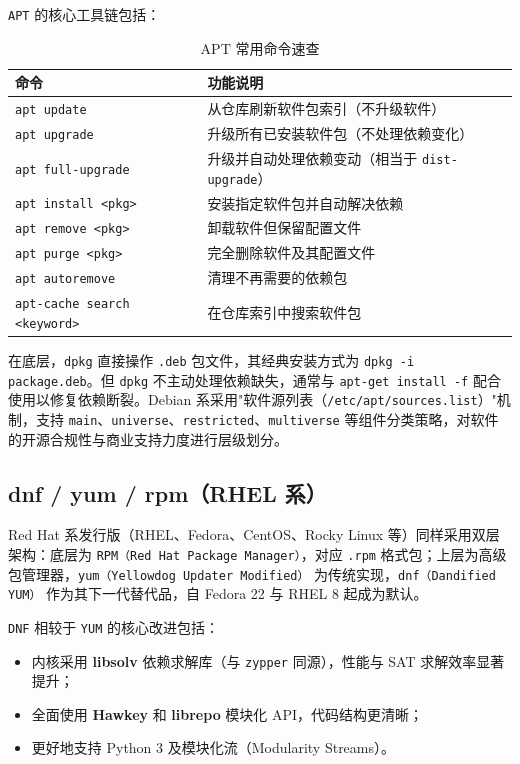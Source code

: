 \documentclass[12pt,UTF8]{ctexbook}
\begin{document}
\texttt{APT} 的核心工具链包括：

\begin{table}[htbp]
	\centering
	\caption{APT 常用命令速查}
	\begin{tabular}{@{}ll@{}}
		\toprule
		\textbf{命令} & \textbf{功能说明} \\
		\midrule
		\verb|apt update| & 从仓库刷新软件包索引（不升级软件） \\
		\verb|apt upgrade| & 升级所有已安装软件包（不处理依赖变化） \\
		\verb|apt full-upgrade| & 升级并自动处理依赖变动（相当于 \verb|dist-upgrade|） \\
		\verb|apt install <pkg>| & 安装指定软件包并自动解决依赖 \\
		\verb|apt remove <pkg>| & 卸载软件但保留配置文件 \\
		\verb|apt purge <pkg>| & 完全删除软件及其配置文件 \\
		\verb|apt autoremove| & 清理不再需要的依赖包 \\
		\verb|apt-cache search <keyword>| & 在仓库索引中搜索软件包 \\
		\bottomrule
	\end{tabular}
\end{table}

在底层，\texttt{dpkg} 直接操作 \texttt{.deb} 包文件，其经典安装方式为 \verb|dpkg -i package.deb|。但 \texttt{dpkg} 不主动处理依赖缺失，通常与 \verb|apt-get install -f| 配合使用以修复依赖断裂。Debian 系采用"软件源列表（\texttt{/etc/apt/sources.list}）"机制，支持 \texttt{main}、\texttt{universe}、\texttt{restricted}、\texttt{multiverse} 等组件分类策略，对软件的开源合规性与商业支持力度进行层级划分。

\subsection{dnf / yum / rpm（RHEL 系）}

Red Hat 系发行版（RHEL、Fedora、CentOS、Rocky Linux 等）同样采用双层架构：底层为 \texttt{RPM（Red Hat Package Manager）}，对应 \texttt{.rpm} 格式包；上层为高级包管理器，\texttt{yum（Yellowdog Updater Modified）} 为传统实现，\texttt{dnf（Dandified YUM）} 作为其下一代替代品，自 Fedora 22 与 RHEL 8 起成为默认。

\texttt{DNF} 相较于 \texttt{YUM} 的核心改进包括：
\begin{itemize}
	\item 内核采用 \textbf{libsolv} 依赖求解库（与 \texttt{zypper} 同源），性能与 SAT 求解效率显著提升；
	\item 全面使用 \textbf{Hawkey} 和 \textbf{librepo} 模块化 API，代码结构更清晰；
	\item 更好地支持 Python 3 及模块化流（Modularity Streams）。
\end{itemize}
\end{document}
